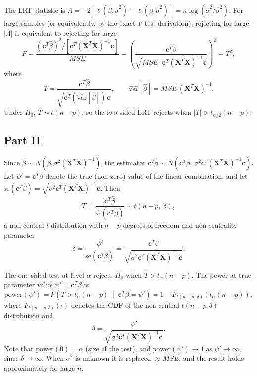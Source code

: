 \documentclass[letterpaper]{article}
\begin{document}
			The LRT statistic is $\Lambda = -2[\ell(\tilde\beta,\tilde\sigma^2) - \ell(\hat\beta,\hat\sigma^2)] = n\log(\tilde\sigma^2/\hat\sigma^2)$.
			For large samples (or equivalently, by the exact $F$-test derivation), rejecting for large $|\Lambda|$
			is equivalent to rejecting for large
			\[
			F = \frac{(\mathbf{c}^T\hat{\beta})^2 / [\mathbf{c}^T(\mathbf{X}^T\mathbf{X})^{-1}\mathbf{c}]}{MSE}
			= \left(\frac{\mathbf{c}^T\hat{\beta}}{\sqrt{MSE\cdot\mathbf{c}^T(\mathbf{X}^T\mathbf{X})^{-1}\mathbf{c}}}\right)^2
			= T^2,
			\]
			where
			\[
			T = \frac{\mathbf{c}^T\hat{\beta}}{\sqrt{\mathbf{c}^T(\widehat{\mathrm{var}}[\hat{\beta}])\,\mathbf{c}}},
			\qquad
			\widehat{\mathrm{var}}[\hat{\beta}] = MSE\,(\mathbf{X}^T\mathbf{X})^{-1}.
			\]
			Under $H_0$, $T \sim t(n-p)$, so the two-sided LRT rejects when $|T| > t_{\alpha/2}(n-p)$. 
			
			\clearpage
			\subsection{Part II}
			
			Since $\hat\beta \sim N(\beta, \sigma^2(\mathbf{X}^T\mathbf{X})^{-1})$,
			the estimator $\mathbf{c}^T\hat\beta \sim N(\mathbf{c}^T\beta,\, \sigma^2\mathbf{c}^T(\mathbf{X}^T\mathbf{X})^{-1}\mathbf{c})$.
			Let $\psi' = \mathbf{c}^T\beta$ denote the true (non-zero) value of the linear combination,
			and let $\mathrm{se}(\mathbf{c}^T\hat\beta) = \sqrt{\sigma^2\mathbf{c}^T(\mathbf{X}^T\mathbf{X})^{-1}\mathbf{c}}$.
			Then
			\[
			T = \frac{\mathbf{c}^T\hat\beta}{\widehat{\mathrm{se}}(\mathbf{c}^T\hat\beta)}
			\sim t\!\left(n-p,\; \delta\right),
			\]
			a non-central $t$ distribution with $n - p$ degrees of freedom and non-centrality parameter
			\[
			\delta = \frac{\psi'}{\mathrm{se}(\mathbf{c}^T\hat\beta)}
			= \frac{\mathbf{c}^T\beta}{\sqrt{\sigma^2\mathbf{c}^T(\mathbf{X}^T\mathbf{X})^{-1}\mathbf{c}}}.
			\]
			
			The one-sided test at level $\alpha$ rejects $H_0$ when $T > t_\alpha(n-p)$.
			The power at true parameter value $\psi' = \mathbf{c}^T\beta$ is
			\[
			\mathrm{power}(\psi')
			= P\!\left(T > t_\alpha(n-p) \;\middle|\; \mathbf{c}^T\beta = \psi'\right)
			= 1 - F_{t(n-p,\,\delta)}\!\left(t_\alpha(n-p)\right),
			\]
			where $F_{t(n-p,\delta)}(\cdot)$ denotes the CDF of the non-central $t(n-p, \delta)$ distribution and
			\[
			\delta = \frac{\psi'}{\sqrt{\sigma^2\mathbf{c}^T(\mathbf{X}^T\mathbf{X})^{-1}\mathbf{c}}}.
			\]
			Note that $\mathrm{power}(0) = \alpha$ (size of the test), and $\mathrm{power}(\psi') \to 1$
			as $\psi' \to \infty$, since $\delta \to \infty$. When $\sigma^2$ is unknown it is replaced by $MSE$,
			and the result holds approximately for large $n$. 
			
\end{document}
